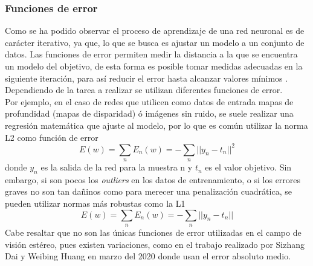 \subsubsection{Funciones de error}
Como se ha podido observar el proceso de aprendizaje de una red neuronal es de carácter iterativo, ya que, lo que se busca es ajustar un modelo a un conjunto de datos. Las funciones de error permiten medir la distancia a la que se encuentra un modelo del objetivo, de esta forma es posible tomar medidas adecuadas en la siguiente iteración, para así reducir el error hasta alcanzar valores mínimos \cite[p~280]{Szeliski2022}. Dependiendo de la tarea a realizar se utilizan diferentes funciones de error. 
\\
Por ejemplo, en el caso de redes que utilicen como datos de entrada mapas de profundidad (mapas de disparidad) ó imágenes sin ruido, se suele realizar una regresión matemática que ajuste al modelo, por lo que es común utilizar la norma L2 como función de error
\begin{equation}
    E(w) = \sum_{n} E_{n}(w) = - \sum_{n} ||y_{n} - t_{n}||^{2}
\end{equation}
donde $y_{n}$ es la salida de la red para la muestra n y $t_{n}$ es el valor objetivo. Sin embargo, si son pocos los \textit{outliers} en los datos de entrenamiento, o si los errores graves no son tan dañinos como para merecer una penalización cuadrática, se pueden utilizar normas más robustas como la L1
\begin{equation}
    E(w) = \sum_{n} E_{n}(w) = - \sum_{n} ||y_{n} - t_{n}||
\end{equation}
Cabe resaltar que no son las únicas funciones de error utilizadas en el campo de visión estéreo, pues existen variaciones, como en el trabajo realizado por Sizhang Dai y Weibing Huang en marzo del 2020 \cite{dai2020atvsnet} donde usan el error absoluto medio.
